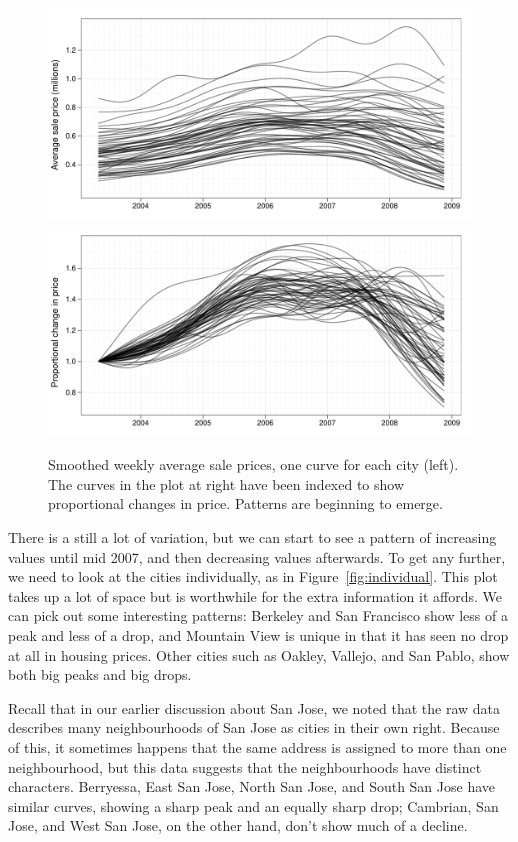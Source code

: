 \documentclass[oneside]{article}
\begin{document}
\begin{figure}[htbp]
  \centering
  \includegraphics[width=0.5 \linewidth]{cities-smooth}%
  \includegraphics[width=0.5 \linewidth]{cities-indexed}
  \caption{Smoothed weekly average sale prices, one curve for each city (left).  The curves in the plot at right have been indexed to show proportional changes in price.  Patterns are beginning to emerge.}
  \label{fig:smoothed}
\end{figure}

There is a still a lot of variation, but we can start to see a pattern of increasing values until mid 2007, and then decreasing values afterwards.  To get any further, we need to look at the cities individually, as in Figure~\ref{fig:individual}.  This plot takes up a lot of space but is worthwhile for the extra information it affords.  We can pick out some interesting patterns: Berkeley and San Francisco show less of a peak and less of a drop, and Mountain View is unique in that it has seen no drop at all in housing prices.  Other cities such as Oakley, Vallejo, and San Pablo, show both big peaks and big drops.


Recall that in our earlier discussion about San Jose, we noted that the raw data describes many neighbourhoods of San Jose as cities in their own right.  Because of this, it sometimes happens that the same address is assigned to more than one neighbourhood, but this data suggests that the neighbourhoods have distinct characters.  Berryessa, East San Jose, North San Jose, and South San Jose have similar curves, showing a sharp peak and an equally sharp drop;  Cambrian, San Jose, and West San Jose, on the other hand, don't show much of a decline.
\end{document}

